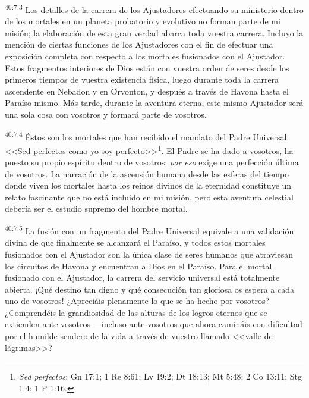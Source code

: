 \par
\textsuperscript{40:7.3} Los detalles de la carrera de los Ajustadores efectuando su ministerio dentro de los mortales en un planeta probatorio y evolutivo no forman parte de mi misión; la elaboración de esta gran verdad abarca toda vuestra carrera. Incluyo la mención de ciertas funciones de los Ajustadores con el fin de efectuar una exposición completa con respecto a los mortales fusionados con el Ajustador. Estos fragmentos interiores de Dios están con vuestra orden de seres desde los primeros tiempos de vuestra existencia física, luego durante toda la carrera ascendente en Nebadon y en Orvonton, y después a través de Havona hasta el Paraíso mismo. Más tarde, durante la aventura eterna, este mismo Ajustador será una sola cosa con vosotros y formará parte de vosotros.

\par
\textsuperscript{40:7.4} Éstos son los mortales que han recibido el mandato del Padre Universal: <<Sed perfectos como yo soy perfecto>>\footnote{\textit{Sed perfectos}: Gn 17:1; 1 Re 8:61; Lv 19:2; Dt 18:13; Mt 5:48; 2 Co 13:11; Stg 1:4; 1 P 1:16.}. El Padre se ha dado a vosotros, ha puesto su propio espíritu dentro de vosotros; \textit{por eso} exige una perfección última de vosotros. La narración de la ascensión humana desde las esferas del tiempo donde viven los mortales hasta los reinos divinos de la eternidad constituye un relato fascinante que no está incluido en mi misión, pero esta aventura celestial debería ser el estudio supremo del hombre mortal.

\par
\textsuperscript{40:7.5} La fusión con un fragmento del Padre Universal equivale a una validación divina de que finalmente se alcanzará el Paraíso, y todos estos mortales fusionados con el Ajustador son la única clase de seres humanos que atraviesan los circuitos de Havona y encuentran a Dios en el Paraíso. Para el mortal fusionado con el Ajustador, la carrera del servicio universal está totalmente abierta. ¡Qué destino tan digno y qué consecución tan gloriosa os espera a cada uno de vosotros! ¿Apreciáis plenamente lo que se ha hecho por vosotros? ¿Comprendéis la grandiosidad de las alturas de los logros eternos que se extienden ante vosotros ---incluso ante vosotros que ahora camináis con dificultad por el humilde sendero de la vida a través de vuestro llamado <<valle de lágrimas>>?

